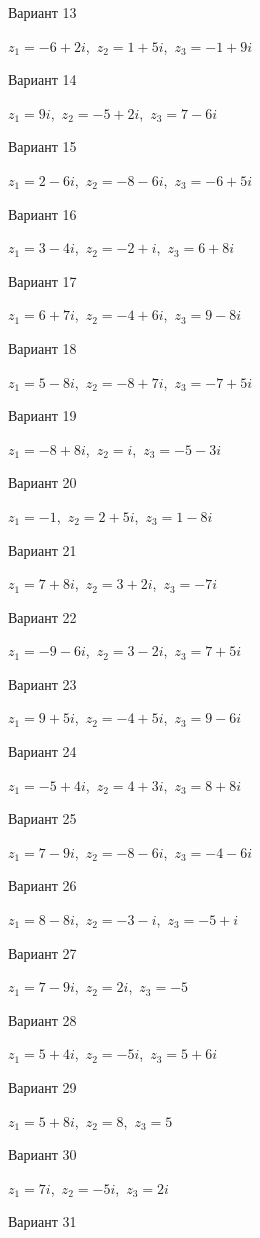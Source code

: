 \documentclass[11pt]{report}
\begin{document}
Вариант 13

$z_1 = -6 + 2 i$,\ $z_2 = 1 + 5 i$,\ $z_3 = -1 + 9 i$

Вариант 14

$z_1 = 9 i$,\ $z_2 = -5 + 2 i$,\ $z_3 = 7 - 6 i$

Вариант 15

$z_1 = 2 - 6 i$,\ $z_2 = -8 - 6 i$,\ $z_3 = -6 + 5 i$

Вариант 16

$z_1 = 3 - 4 i$,\ $z_2 = -2 + i$,\ $z_3 = 6 + 8 i$

Вариант 17

$z_1 = 6 + 7 i$,\ $z_2 = -4 + 6 i$,\ $z_3 = 9 - 8 i$

Вариант 18

$z_1 = 5 - 8 i$,\ $z_2 = -8 + 7 i$,\ $z_3 = -7 + 5 i$

Вариант 19

$z_1 = -8 + 8 i$,\ $z_2 = i$,\ $z_3 = -5 - 3 i$

Вариант 20

$z_1 = -1$,\ $z_2 = 2 + 5 i$,\ $z_3 = 1 - 8 i$

Вариант 21

$z_1 = 7 + 8 i$,\ $z_2 = 3 + 2 i$,\ $z_3 = - 7 i$

Вариант 22

$z_1 = -9 - 6 i$,\ $z_2 = 3 - 2 i$,\ $z_3 = 7 + 5 i$

Вариант 23

$z_1 = 9 + 5 i$,\ $z_2 = -4 + 5 i$,\ $z_3 = 9 - 6 i$

Вариант 24

$z_1 = -5 + 4 i$,\ $z_2 = 4 + 3 i$,\ $z_3 = 8 + 8 i$

Вариант 25

$z_1 = 7 - 9 i$,\ $z_2 = -8 - 6 i$,\ $z_3 = -4 - 6 i$

Вариант 26

$z_1 = 8 - 8 i$,\ $z_2 = -3 - i$,\ $z_3 = -5 + i$

Вариант 27

$z_1 = 7 - 9 i$,\ $z_2 = 2 i$,\ $z_3 = -5$

Вариант 28

$z_1 = 5 + 4 i$,\ $z_2 = - 5 i$,\ $z_3 = 5 + 6 i$

Вариант 29

$z_1 = 5 + 8 i$,\ $z_2 = 8$,\ $z_3 = 5$

Вариант 30

$z_1 = 7 i$,\ $z_2 = - 5 i$,\ $z_3 = 2 i$

Вариант 31
\end{document}

